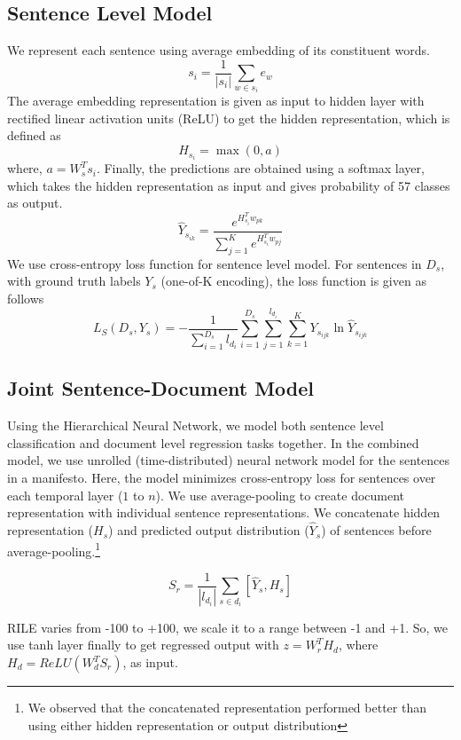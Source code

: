 \documentclass[11pt,a4paper]{article}
\begin{document}
\subsection{Sentence Level Model}
We represent each sentence using average embedding of its constituent words.
\[ s_{i} = \frac{1}{|s_{i}|}\sum_{w \in s_{i}} e_{w} \]
The average embedding representation is given as input to hidden layer with rectified linear activation units (ReLU) to get the hidden representation, which is defined as 
\[H_{s_{i}}= \max(0,a)\] where, $a = W_{s}^{T}s_{i}$. Finally, the predictions are obtained using a softmax layer, which takes the hidden representation as input and gives probability of 57 classes as output.
\[ \hat{Y}_{s_{ik}} = \frac{e^{H_{s_{i}}^T w_{pk}}}{\sum_{j=1}^{K}{e^{H_{s_{i}}^T w_{pj}}}}\]
We use cross-entropy loss function for sentence level model. For sentences in $D_{s}$, with ground truth labels $Y_{s}$ (one-of-K encoding), the loss function is given as follows
\begin{equation}
L_{S}(D_{s},Y_{s})=-\frac{1}{\sum_{i=1}^{D_{s}}l_{d_{i}}}\sum_{i=1}^{D_{s}}\sum_{j=1}^{l_{d_{i}}}\sum_{k=1}^{K} Y_{s_{ijk}} \ln \hat{Y}_{s_{ijk}}  
\end{equation}
\subsection{Joint Sentence-Document Model}
Using the Hierarchical Neural Network, we model both sentence level classification and document level regression tasks together. In the combined model, we use unrolled (time-distributed) neural network model for the sentences in a manifesto. Here, the model minimizes cross-entropy loss for sentences over each temporal layer ($1$ to $n$). We use average-pooling to create document representation with individual sentence representations. We concatenate hidden representation ($H_{s}$) and predicted output distribution ($\hat{Y}_{s}$) of sentences before average-pooling.\footnote{We observed that the concatenated representation performed better than using either hidden representation or output distribution}

\[ S_{r} = \frac{1}{|l_{d_{i}}|}\sum_{s \in d_{i}} [\hat{Y}_{s}, H_{s}] \]

RILE varies from -100 to +100, we scale it to a range between -1 and +1. So, we use tanh layer finally to get regressed output with $z = W_{r}^{T}H_{d}$, where $H_{d} = ReLU(W_{d}^{T}S_{r})$, as input.
\end{document}

